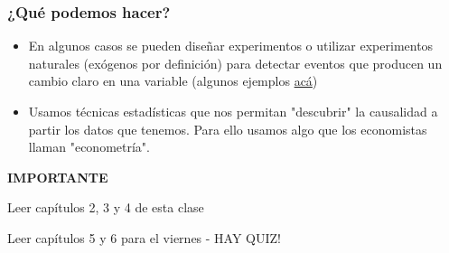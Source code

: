 \documentclass{beamer}
\begin{document}
\begin{frame} 
    \frametitle{¿Qué podemos hacer?}
    \begin{itemize}
        \item  En algunos casos se pueden diseñar experimentos o utilizar experimentos naturales (exógenos por definición) para detectar eventos que producen un cambio claro en una variable (algunos ejemplos \hyperlink{hdos}{acá})
         \item Usamos técnicas estadísticas que nos permitan "descubrir" la causalidad a partir los datos que tenemos. Para ello usamos algo que los economistas llaman "econometría". 
    \end{itemize}
\end{frame}
 

\begin{frame}
    \begin{center}
        \LARGE  \textbf{IMPORTANTE}  \\ \vspace{1cm}
        \Large 
        \begin{boxB}
        \centering Leer capítulos 2, 3 y 4 de esta clase
        \end{boxB}
        \vspace{0.5cm}
        \begin{boxB}
        Leer capítulos 5 y 6 para el viernes - HAY QUIZ!
        \end{boxB}
    \end{center}
\end{frame}

\end{document}
